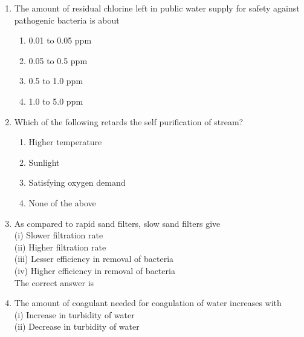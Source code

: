 \documentclass[11pt,a4paper]{article}
\begin{document}
\begin{enumerate}
\item{The amount of residual chlorine left in public water supply for safety against pathogenic bacteria is about}
\begin{enumerate}[label=\Alph*.]
\item{0.01 to 0.05 ppm}
\item{0.05 to 0.5 ppm}
\item{0.5 to 1.0 ppm}
\item{1.0 to 5.0 ppm}
\end{enumerate}
\item{Which of the following retards the self purification of stream?}
\begin{enumerate}[label=\Alph*.]
\item{Higher temperature}
\item{Sunlight}
\item{Satisfying oxygen demand}
\item{None of the above}
\end{enumerate}
\item{As compared to rapid sand filters, slow sand filters give \\
 (i) Slower filtration rate \\
 (ii) Higher filtration rate \\
 (iii) Lesser efficiency in removal of bacteria \\
 (iv) Higher efficiency in removal of bacteria \\
 The correct answer is}
\\
\item{The amount of coagulant needed for coagulation of water increases with \\

(i) Increase in turbidity of water \\

(ii) Decrease in turbidity of water \\

}
\end{enumerate}
\end{document}
